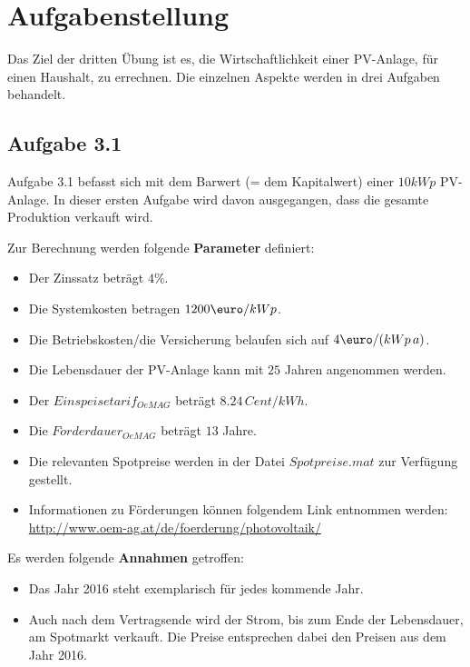 \documentclass[a4paper,12pt]{article}
\begin{document}
	

	\newpage
	\tableofcontents

	\newpage
	\section{Aufgabenstellung}
	Das Ziel der dritten Übung ist es, die Wirtschaftlichkeit einer PV-Anlage, für einen Haushalt, zu errechnen.\newline
	Die einzelnen Aspekte werden in drei Aufgaben behandelt.
	\subsection{Aufgabe 3.1}
	Aufgabe 3.1 befasst sich mit dem Barwert (= dem Kapitalwert) einer $10kWp$ PV-Anlage.\newline
	In dieser ersten Aufgabe wird davon ausgegangen, dass die gesamte Produktion verkauft wird.\\ \par
	\noindent Zur Berechnung werden folgende \textbf{Parameter} definiert:
	\begin{itemize}
		\item Der Zinssatz beträgt $4\%$.
		\item Die Systemkosten betragen $1200\mbox{\euro}/kWp$.
		\item Die Betriebskosten/die Versicherung belaufen sich auf $4\mbox{\euro}/(kWp\,a)$.
		\item Die Lebensdauer der PV-Anlage kann mit $25$ Jahren angenommen werden.
		\item Der $Einspeisetarif_{OeMAG}$ beträgt $8.24\,Cent/kWh$.
		\item Die $F\ddot{o}rderdauer_{OeMAG}$ beträgt $13$ Jahre.
		\item Die relevanten Spotpreise werden in der Datei $Spotpreise.mat$ zur Verfügung gestellt.
		\item Informationen zu Förderungen können folgendem Link entnommen werden:\newline
		\url{http://www.oem-ag.at/de/foerderung/photovoltaik/}
	\end{itemize}
	Es werden folgende \textbf{Annahmen} getroffen:
	\begin{itemize}
		\item Das Jahr 2016 steht exemplarisch für jedes kommende Jahr.
		\item Auch nach dem Vertragsende wird der Strom, bis zum Ende der Lebensdauer, am Spotmarkt verkauft. Die Preise entsprechen dabei den Preisen aus dem Jahr 2016.
	\end{itemize}
\end{document}

